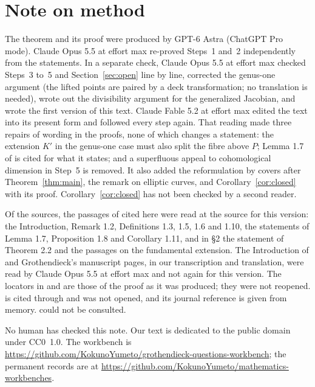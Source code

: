 \documentclass[11pt]{amsart}
\newcommand{\workbenchurl}{https://github.com/KokunoYumeto/grothendieck-questions-workbench}
\newcommand{\recordurl}{https://github.com/KokunoYumeto/mathematics-workbenches}
\theoremstyle{remark}
\begin{document}
\section*{Note on method}
The theorem and its proof were produced by GPT-6 Astra (ChatGPT Pro mode). Claude Opus 5.5 at effort max re-proved Steps~1 and~2 independently from the statements. In a separate check, Claude Opus 5.5 at effort max checked Steps~3 to~5 and Section~\ref{sec:open} line by line, corrected the genus-one argument (the lifted points are paired by a deck transformation; no translation is needed), wrote out the divisibility argument for the generalized Jacobian, and wrote the first version of this text. Claude Fable 5.2 at effort max edited the text into its present form and followed every step again. That reading made three repairs of wording in the proofs, none of which changes a statement: the extension $K'$ in the genus-one case must also split the fibre above $P$; Lemma 1.7 of \cite{ST09} is cited for what it states; and a superfluous appeal to cohomological dimension in Step~5 is removed. It also added the reformulation by covers after Theorem~\ref{thm:main}, the remark on elliptic curves, and Corollary~\ref{cor:closed} with its proof. Corollary~\ref{cor:closed} has not been checked by a second reader.

Of the sources, the passages of \cite{ST09} cited here were read at the source for this version: the Introduction, Remark 1.2, Definitions 1.3, 1.5, 1.6 and 1.10, the statements of Lemma 1.7, Proposition 1.8 and Corollary 1.11, and in \S 2 the statement of Theorem 2.2 and the passages on the fundamental extension. The Introduction of \cite{ST18} and Grothendieck's manuscript pages, in our transcription and translation, were read by Claude Opus 5.5 at effort max and not again for this version. The locators in \cite{SGA1} and \cite{WeilI} are those of the proof as it was produced; they were not reopened. \cite{Moch} is cited through \cite[\S 2]{ST09} and was not opened, and its journal reference is given from memory. \cite{Stix} could not be consulted.

No human has checked this note. Our text is dedicated to the public domain under CC0~1.0. The workbench is \expandafter\url\expandafter{\workbenchurl}; the permanent records are at \expandafter\url\expandafter{\recordurl}.
\end{document}
